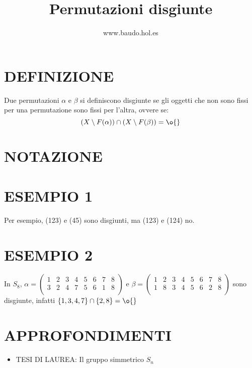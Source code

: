 \documentclass[a4paper,10pt]{article}
\title{Permutazioni disgiunte}
\author{www.baudo.hol.es}
\begin{document}
\maketitle

\section{DEFINIZIONE}
Due permutazioni $\alpha$ e $\beta$ si definiscono disgiunte se gli oggetti che non sono fissi per una permutazione
sono fissi per l'altra, ovvere se:
\[
 (X \setminus F(\alpha))\cap (X \setminus F(\beta))=\o{}
\]


\section{NOTAZIONE}

\section{ESEMPIO 1}
Per esempio, (123) e (45) sono disgiunti, ma (123) e (124) no. 

\section{ESEMPIO 2}
In $S_{8}$, $\alpha = \left( \begin{array}{cccccccc} 1 & 2 & 3 & 4 & 5 & 6 & 7 & 8 \\ 3 & 2 & 4 & 7 & 5 & 6 & 1 & 8 \\ \end{array} \right)$
e $\beta = \left( \begin{array}{cccccccc} 1 & 2 & 3 & 4 & 5 & 6 & 7 & 8 \\ 1 & 8 & 3 & 4 & 5 & 6 & 2 & 8 \\ \end{array} \right)$
sono disgiunte, infatti $\{ 1,3,4,7 \} \cap \{ 2,8 \} = \o{}$

\section{APPROFONDIMENTI}
\begin{itemize}
 \item TESI DI LAUREA: Il gruppo simmetrico $S_{n}$ \cite{simmetrico1}
\end{itemize}



\end{document}
